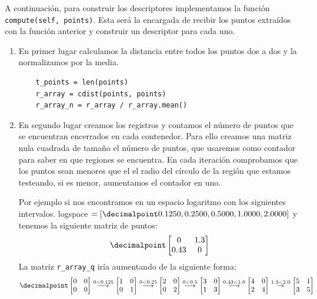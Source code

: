 \documentclass[size=a4, parskip=half, titlepage=false, toc=flat, toc=bib, 12pt]{scrartcl}
\begin{document}
A continuación, para construir los descriptores implementamos la función \texttt{compute(self, points)}. Esta será la encargada de recibir los puntos extraídos con la función anterior y construir un descriptor para cada uno.
\begin{enumerate}
\item En primer lugar calculamos la distancia entre todos los puntos dos a dos y la normalizamos por la media.

\begin{verbatim}
    t_points = len(points)
    r_array = cdist(points, points)
    r_array_n = r_array / r_array.mean()
\end{verbatim}

\item En segundo lugar creamos los registros y contamos el número de puntos que se encuentran encerrados en cada contenedor. Para ello creamos una matriz nula cuadrada de tamaño el número de puntos, que usaremos como contador para saber en que regiones se encuentra. En cada iteración comprobamos que los puntos sean menores que el el radio del círculo de la región que estamos testeando, si es menor, aumentamos el contador en uno.

Por ejemplo si nos encontramos en un espacio logaritmo con los siguientes intervalos.
logspace $= [\decimalpoint 0.1250, 0.2500, 0.5000, 1.0000, 2.0000]$ y tenemos la siguiente matriz de puntos:
$$\decimalpoint \begin{bmatrix}
0 & 1.3 \\
0.43 & 0
\end{bmatrix}$$
La matriz \verb|r_array_q| iría aumentando de la siguiente forma:
$$\decimalpoint \begin{bmatrix}
0 & 0 \\
0 & 0
\end{bmatrix} \stackrel{0 < 0.125}{\longrightarrow} \begin{bmatrix}
1 & 0 \\
0 & 1
\end{bmatrix} \stackrel{0 < 0.25}{\longrightarrow} \begin{bmatrix}
2 & 0 \\
0 & 2
\end{bmatrix} \stackrel{0 < 0.5}{\longrightarrow} \begin{bmatrix}
3 & 0 \\
1 & 3
\end{bmatrix} \stackrel{0.43 < 1.0}{\longrightarrow} \begin{bmatrix}
4 & 0 \\
2 & 4
\end{bmatrix} \stackrel{1.3 < 2.0}\rightarrow \begin{bmatrix}
5 & 1 \\
3 & 5
\end{bmatrix}$$


\end{enumerate}
\end{document}
